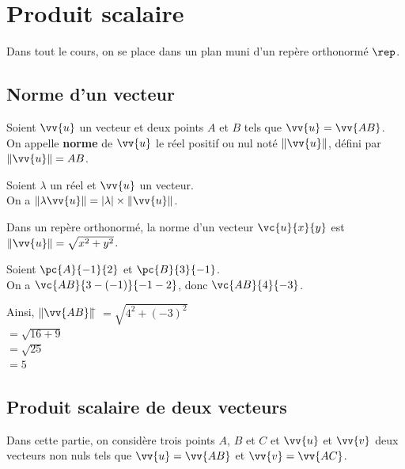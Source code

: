 \documentclass[a4paper,11pt,cours]{nsi} %
\begin{document}
\setcounter{chapter}{8} %



\chapter{Produit scalaire}


Dans tout le cours, on se place dans un plan muni d'un repère orthonormé $\rep$.
\section{Norme d'un vecteur}

\begin{definition}[]
    Soient $\vv{u}$ un vecteur et deux points $A$ et $B$ tels que $\vv{u} = \vv{AB}$.\\
    On appelle \textbf{norme} de $\vv{u}$ le réel positif ou nul noté $\left\|\vv{u}\right\|$, défini par $\left\|\vv{u}\right\| = AB$.
\end{definition}

\begin{propriete}[]
    Soient $\lambda$ un réel et $\vv{u}$ un vecteur.\\
    On a $\left\|\lambda \vv{u}\right\| = \left|\lambda\right| \times \left\|\vv{u}\right\|$.
\end{propriete}

\begin{propriete}[]
    Dans un repère orthonormé, la norme d'un vecteur $\vc{u}{x}{y}$ est $\left\|\vv{u}\right\| = \sqrt{x^2 + y^2}$.
\end{propriete}

\begin{exemple}[]
    Soient $\pc{A}{-1}{2}$ et $\pc{B}{3}{-1}$.\\[.5em]
    On a $\vc{AB}{3-(-1)}{-1-2}$, donc $\vc{AB}{4}{-3}$.
    \begin{tabbing}
         Ainsi, $\left\|\vv{AB}\right\|$\= $= \sqrt{4^2 + (-3)^2}$\\
         \>$ = \sqrt{16 + 9}$\\
         \>$ = \sqrt{25}$\\
         \>$ = 5$
    \end{tabbing}
\end{exemple}
\newpage

\section{Produit scalaire de deux vecteurs}
Dans cette partie, on considère trois points $A$, $B$ et $C$ et $\vv{u}$ et $\vv{v}$ deux vecteurs non nuls tels que $\vv{u} = \vv{AB}$ et $\vv{v} = \vv{AC}$.\\
\end{document}
